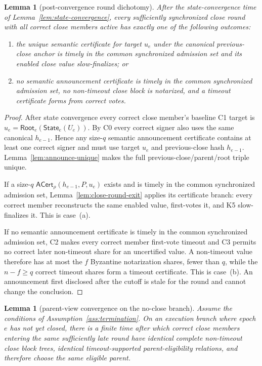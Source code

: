 \documentclass[11pt]{article}
\newtheorem{lemma}[theorem]{Lemma}
\theoremstyle{definition}
\theoremstyle{remark}
\newcommand{\Root}{\mathsf{Root}}
\newcommand{\State}{\mathsf{State}}
\newcommand{\ACert}{\mathsf{ACert}}
\begin{document}
\begin{lemma}[post-convergence round dichotomy]
\label{lem:round-dichotomy}
After the state-convergence time of Lemma~\ref{lem:state-convergence}, every sufficiently synchronized close round with all correct close members active has exactly one of the following outcomes:
\begin{enumerate}[label=(\alph*)]
  \item the unique semantic certificate for target $u_e$ under the canonical previous-close anchor is timely in the common synchronized admission set and its enabled close value slow-finalizes; or
  \item no semantic announcement certificate is timely in the common synchronized admission set, no non-timeout close block is notarized, and a timeout certificate forms from correct votes.
\end{enumerate}
\end{lemma}

\begin{proof}
After state convergence every correct close member's baseline C1 target is $u_e=\Root_e(\State_e(U_e))$. By C0 every correct signer also uses the same canonical $h_{e-1}$. Hence any size-$q$ semantic announcement certificate contains at least one correct signer and must use target $u_e$ and previous-close hash $h_{e-1}$. Lemma~\ref{lem:announce-unique} makes the full previous-close/parent/root triple unique.

If a size-$q$ $\ACert_\rho(h_{e-1},P,u_e)$ exists and is timely in the common synchronized admission set, Lemma~\ref{lem:close-round-exit} applies its certificate branch: every correct member reconstructs the same enabled value, first-votes it, and K5 slow-finalizes it. This is case~(a).

If no semantic announcement certificate is timely in the common synchronized admission set, C2 makes every correct member first-vote timeout and C3 permits no correct later non-timeout share for an uncertified value. A non-timeout value therefore has at most the $f$ Byzantine notarization shares, fewer than $q$, while the $n-f\ge q$ correct timeout shares form a timeout certificate. This is case~(b). An announcement first disclosed after the cutoff is stale for the round and cannot change the conclusion.
\end{proof}

\begin{lemma}[parent-view convergence on the no-close branch]
\label{lem:parent-convergence}
Assume the conditions of Assumption~\ref{ass:termination}. On an execution branch where epoch $e$ has not yet closed, there is a finite time after which correct close members entering the same sufficiently late round have identical complete non-timeout close block trees, identical timeout-supported parent-eligibility relations, and therefore choose the same eligible parent.
\end{lemma}
\end{document}
